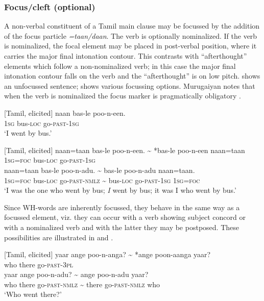 \subsubsection{Focus/cleft (optional)}%

A non-verbal constituent of a Tamil main clause may be focussed by the addition of the focus particle {\em =taan/daan}. The verb is optionally nominalized. If the verb is nominalized, the focal element may be placed in post-verbal position, where it carries the major final intonation contour. This contrasts with ``afterthought'' elements which follow a non-nominalized verb; in this case the major final intonation contour falls on the verb and the ``afterthought'' is on low pitch.  shows an unfocussed sentence;  shows various focussing options. Murugaiyan notes that when the verb is nominalized the focus marker is pragmatically obligatory   \citep[56]{Murugaiyan2009}.

\ea\label{smith:ex:12}
{}[Tamil, elicited]
\gll naan bas-le poo-n-een.\\
1\textsc{sg} bus-\textsc{loc} go-\textsc{past}-1\textsc{sg} \\
`I went by bus.'
\z


\ea\label{smith:ex:13}
{}[Tamil, elicited] 
\ea
\gll naan=taan bas-le poo-n-een. \~{} *bas-le poo-n-een naan=taan  \\
1\textsc{sg}=\textsc{foc} bus-\textsc{loc} go-\textsc{past}-1\textsc{sg} \\
\ex
\gll naan=taan bas-le poo-n-adu. \~{} bas-le poo-n-adu naan=taan.\\
1\textsc{sg}=\textsc{foc} bus-\textsc{loc} go-\textsc{past}-\textsc{nmlz} \~{} bus-\textsc{loc} go-\textsc{past}-1\textsc{sg} 1\textsc{sg}=\textsc{foc}\\
`I was the one who went by bus; \textit{I} went by bus; it was I who went by bus.'
\z
\z

Since WH-words are inherently focussed, they behave in the same way as a focussed element, viz. they can occur with a verb showing subject concord or with a nominalized verb and with the latter they may be postposed. These possibilities are illustrated in  and . 

\ea\label{smith:ex:14}
{}[Tamil, elicited]
\ea
\gll yaar ange poo-n-anga? \~{} *ange poon-aanga yaar?\\
who there go-\textsc{past}-3\textsc{pl} \\
\ex
\gll yaar ange poo-n-adu? \~{} ange poo-n-adu yaar?\\
who there go-\textsc{past}-\textsc{nmlz} \~{} there go-\textsc{past}-\textsc{nmlz} who\\
`Who went there?'
\z
\z

